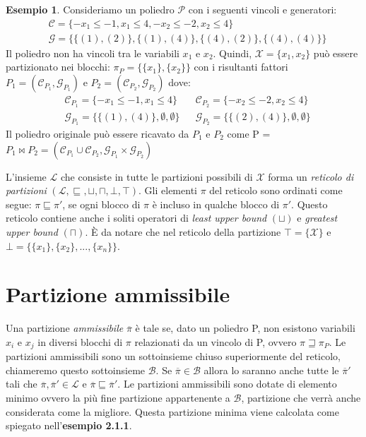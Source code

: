 \documentclass{mimosis}
\theoremstyle{definition}
\newtheorem{exmp}{Esempio}[section]
\begin{document}
\begin{exmp}
  Consideriamo un poliedro $\mathcal{P}$ con i seguenti vincoli e generatori:
  \begin{align*}
    &\mathcal{C} = \{-x_{1} \le -1, x_{1} \le 4, -x_{2} \le -2, x_{2} \le 4\} \\
    &\mathcal{G} = \{\{(1),(2)\}, \{(1),(4)\}, \{(4),(2)\}, \{(4),(4)\}\}
  \end{align*}
  Il poliedro non ha vincoli tra le variabili $x_1$ e $x_2$. Quindi, $\mathcal{X} = \{x_1,x_2\}$
  può essere partizionato nei blocchi: $\pi_P = \{\{x_1\}, \{x_2\}\}$ con i risultanti fattori
  $P_1 = (\mathcal{C}_{P_1}, \mathcal{G}_{P_1})$ e $P_2 = (\mathcal{C}_{P_2}, \mathcal{G}_{P_2})$ dove:
  \begin{align*}
      &\mathcal{C}_{P_{1}} = \{-x_{1} \le -1, x_{1} \le 4\}  &&\mathcal{C}_{P_{2}} = \{ -x_{2} \le -2, x_{2} \le 4\} \\
      &\mathcal{G}_{P_{1}} = \{\{(1),(4)\}, \emptyset, \emptyset \} &&\mathcal{G}_{P_{2}} = \{\{(2),(4)\}, \emptyset, \emptyset \}
  \end{align*}
  Il poliedro originale può essere ricavato da $P_{1}$ e $P_{2}$ come
  P = $P_{1} \bowtie P_{2} = (\mathcal{C}_{P_{1}} \cup \mathcal{C}_{P_{2}}, \mathcal{G}_{P_{1}} \times \mathcal{G}_{P_{2}})$
\end{exmp}

L'insieme \(\mathcal{L}\) che consiste in tutte le partizioni possibili di \(\mathcal{X}\)
forma un \emph{reticolo di partizioni} \((\mathcal{L}, \sqsubseteq, \sqcup, \sqcap,
\bot, \top)\). Gli elementi \(\pi\) del reticolo sono ordinati come segue: \(\pi
\sqsubseteq \pi'\), se ogni blocco di \(\pi\) è incluso in qualche blocco di
\(\pi'\). Questo reticolo contiene anche i soliti operatori di \emph{least upper bound}
\((\sqcup)\) e \emph{greatest upper bound} \((\sqcap)\). È da notare che nel reticolo della
partizione \(\top = \{\mathcal{X}\}\) e \(\bot = \{\{x_1\}, \{x_2\}, ..., \{x_n\}\}\).

\section{Partizione ammissibile}
\label{sec:org8b546c6}
Una partizione \emph{ammissibile} \(\overline{\pi}\) è tale se, dato un poliedro P, non esistono
variabili \(x_i\) e \(x_j\) in diversi blocchi di \(\pi\) relazionati da un vincolo di
P, ovvero \(\pi \sqsupseteq \pi_P\). Le partizioni ammissibili sono un
sottoinsieme chiuso superiormente del reticolo, chiameremo questo sottoinsieme
\(\mathcal{B}\). Se \(\overline{\pi} \in \mathcal{B}\) allora lo saranno anche tutte
le \(\overline{\pi}'\) tali che \(\overline{\pi}, \overline{\pi}' \in \mathcal{L}\) e
\(\overline{\pi} \sqsubseteq \overline{\pi}'\). Le partizioni ammissibili sono
dotate di elemento minimo ovvero la più fine partizione appartenente a
\(\mathcal{B}\), partizione che verrà anche considerata come la migliore. Questa
partizione minima viene calcolata come spiegato nell'\textbf{esempio 2.1.1}.
\end{document}
